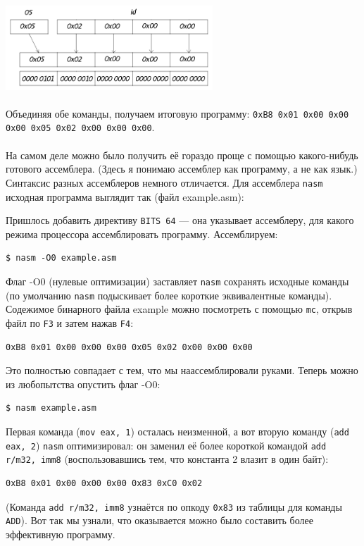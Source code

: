 \documentclass[11pt]{book}
\begin{document}
\\
\includegraphics[height=1.25in]{pic/add_eax_2.png}
\\ \\
Объединяя обе команды, получаем итоговую программу: \texttt{0xB8 0x01 0x00 0x00 0x00 0x05 0x02 0x00 0x00 0x00}.
\\ \\
На самом деле можно было получить её гораздо проще с помощью какого-нибудь готового ассемблера.
(Здесь я понимаю ассемблер как программу, а не как язык.)
Синтаксис разных ассемблеров немного отличается.
Для ассемблера \texttt{nasm} исходная программа выглядит так (файл example.asm):

Пришлось добавить директиву \texttt{BITS 64} --- она указывает ассемблеру, для какого режима процессора ассемблировать программу.
Ассемблируем:
\begin{verbatim}
$ nasm -O0 example.asm
\end{verbatim}
Флаг -O0 (нулевые оптимизации) заставляет \texttt{nasm} сохранять исходные команды
(по умолчанию \texttt{nasm} подыскивает более короткие эквивалентные команды).
Содежимое бинарного файла example можно посмотреть с помощью \texttt{mc}, открыв файл по \texttt{F3} и затем нажав \texttt{F4}:
\begin{verbatim}
0xB8 0x01 0x00 0x00 0x00 0x05 0x02 0x00 0x00 0x00
\end{verbatim}
Это полностью совпадает с тем, что мы наассемблировали руками.
Теперь можно из любопытства опустить флаг -O0:
\begin{verbatim}
$ nasm example.asm
\end{verbatim}
Первая команда (\texttt{mov eax, 1}) осталась неизменной, а вот вторую команду (\texttt{add eax, 2})
\texttt{nasm} оптимизировал: он заменил её более короткой командой \texttt{add r/m32, imm8}
(воспользовавшись тем, что константа 2 влазит в один байт):
\begin{verbatim}
0xB8 0x01 0x00 0x00 0x00 0x83 0xC0 0x02
\end{verbatim}
(Команда \texttt{add r/m32, imm8} узнаётся по опкоду \texttt{0x83} из таблицы для команды \texttt{ADD}).
Вот так мы узнали, что оказывается можно было составить более эффективную программу.
\end{document}
